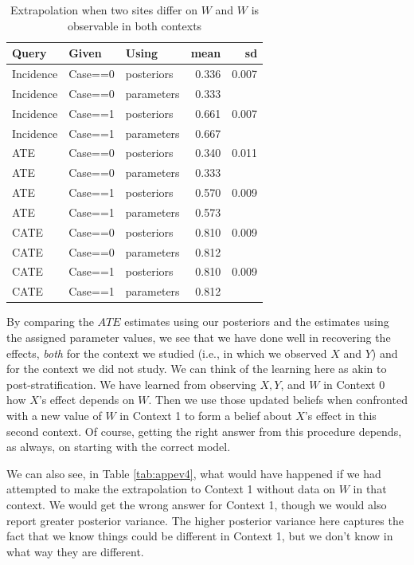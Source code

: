 \documentclass[
  12pt,
]{book}
\begin{document}
\begin{table}

\caption{\label{tab:appev3}Extrapolation when two sites differ on $W$ and $W$ is observable in both contexts}
\centering
\begin{tabular}[t]{l|l|l|r|r}
\hline
Query & Given & Using & mean & sd\\
\hline
Incidence & Case==0 & posteriors & 0.336 & 0.007\\
\hline
Incidence & Case==0 & parameters & 0.333 & \\
\hline
Incidence & Case==1 & posteriors & 0.661 & 0.007\\
\hline
Incidence & Case==1 & parameters & 0.667 & \\
\hline
ATE & Case==0 & posteriors & 0.340 & 0.011\\
\hline
ATE & Case==0 & parameters & 0.333 & \\
\hline
ATE & Case==1 & posteriors & 0.570 & 0.009\\
\hline
ATE & Case==1 & parameters & 0.573 & \\
\hline
CATE & Case==0 & posteriors & 0.810 & 0.009\\
\hline
CATE & Case==0 & parameters & 0.812 & \\
\hline
CATE & Case==1 & posteriors & 0.810 & 0.009\\
\hline
CATE & Case==1 & parameters & 0.812 & \\
\hline
\end{tabular}
\end{table}

By comparing the \(ATE\) estimates using our posteriors and the estimates using the assigned parameter values, we see that we have done well in recovering the effects, \emph{both} for the context we studied (i.e., in which we observed \(X\) and \(Y\)) and for the context we did not study. We can think of the learning here as akin to post-stratification. We have learned from observing \(X, Y\), and \(W\) in Context 0 how \(X\)'s effect depends on \(W\). Then we use those updated beliefs when confronted with a new value of \(W\) in Context 1 to form a belief about \(X\)'s effect in this second context. Of course, getting the right answer from this procedure depends, as always, on starting with the correct model.

We can also see, in Table \ref{tab:appev4}, what would have happened if we had attempted to make the extrapolation to Context 1 without data on \(W\) in that context. We would get the wrong answer for Context 1, though we would also report greater posterior variance. The higher posterior variance here captures the fact that we know things could be different in Context 1, but we don't know in what way they are different.
\end{document}
